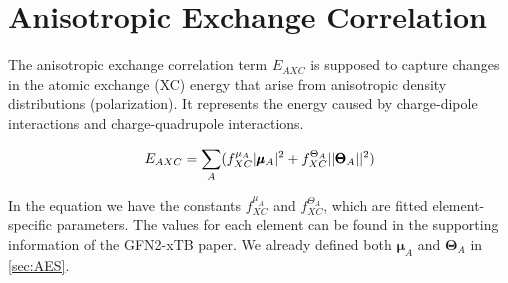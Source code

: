 \section{Anisotropic Exchange Correlation}

The anisotropic exchange correlation term $E_{AXC}$ is supposed to capture changes in the atomic exchange (XC) energy that arise from anisotropic density distributions (polarization). It represents the energy caused by charge-dipole interactions and charge-quadrupole interactions.

\begin{equation}
\begin{split}
        \E{AXC} &= \sum_{A} (f_{XC}^{\mu_A} |\pmb{\mu}_A|^2 + f_{XC}^{\Theta_A} ||\pmb{\Theta}_A||^2)\\
\end{split}
\end{equation}

In the equation we have the constants $f_{XC}^{\mu_A}$ and $f_{XC}^{\Theta_A}$, which are fitted element-specific parameters. The values for each element can be found in the supporting information of the GFN2-xTB paper\cite{bannwarth2019}.
We already defined both $\pmb{\mu}_A$ and $\pmb{\Theta}_A$ in \autoref{sec:AES}. 
